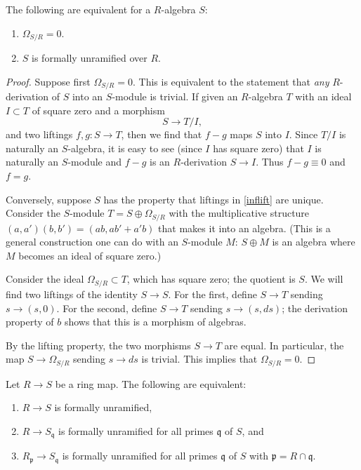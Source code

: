 \begin{proposition} 
The following are equivalent for a $R$-algebra $S$:
\begin{enumerate}
\item  $\Omega_{S/R}=0$.
\item $S$ is formally unramified over $R$.
\end{enumerate}
\end{proposition} 
\begin{proof} 
Suppose first $\Omega_{S/R}=0$. This is equivalent to the statement that
\emph{any} $R$-derivation of $S$ into an $S$-module is trivial.
If given an $R$-algebra $T$ with an ideal $I \subset T$ of square zero and a
morphism 
\[ S \to T/I,  \]
and two liftings $f,g: S \to T$, then we find that $f-g$ maps $S$ into $I$.
Since $T/I$ is naturally an $S$-algebra, it is easy to see (since $I$ has
square zero) that $I$ is naturally an $S$-module and $f-g$ is an
$R$-derivation $S \to I$. 
Thus $f-g \equiv 0$ and $f=g$.

Conversely, suppose $S$ has the property that liftings in \eqref{inflift} are
unique.
Consider the $S$-module $T=S \oplus \Omega_{S/R}$ with the multiplicative
structure $(a,a')(b,b') = (ab, ab' + a'b)$ that makes it into an algebra.
(This is a general construction one can do with an $S$-module $M$: $S \oplus
M$ is an algebra where $M$ becomes an ideal of square zero.)

Consider the ideal $\Omega_{S/R} \subset T$, which has
square zero; the quotient is $S$. We will find two liftings of the identity $S
\to S$. For the first, define $S \to T$ sending $s \to (s,0)$. For the second,
define $S \to T$ sending $s \to (s, ds)$; the derivation property of $b$ shows
that this is a morphism of algebras.

By the lifting property, the two morphisms $S \to T$ are equal. In particular,
the map $S \to \Omega_{S/R}$ sending $s \to ds$ is trivial. This implies that
$\Omega_{S/R}=0$.

\end{proof} 

\begin{lemma}
\label{lemma-formally-unramified-local}
Let $R \to S$ be a ring map.
The following are equivalent:
\begin{enumerate}
\item $R \to S$ is formally unramified,
\item $R \to S_{\mathfrak q}$ is formally unramified for all
primes $\mathfrak q$ of $S$, and
\item $R_{\mathfrak p} \to S_{\mathfrak q}$ is formally unramified
for all primes $\mathfrak q$ of $S$ with $\mathfrak p = R \cap \mathfrak q$.
\end{enumerate}
\end{lemma}

